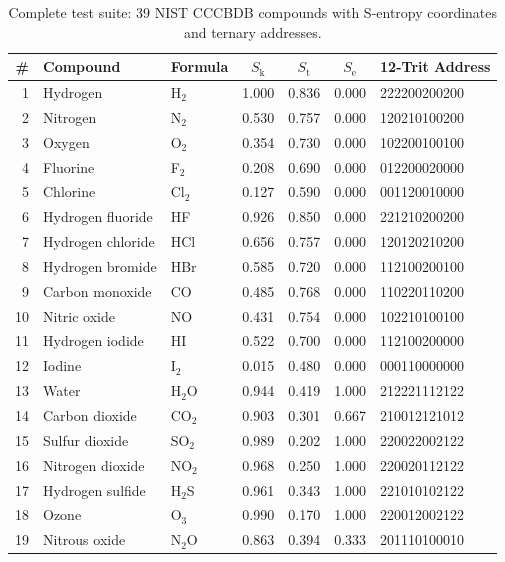 \documentclass[11pt,twocolumn,a4paper]{article}
\theoremstyle{definition}
\theoremstyle{remark}
\newcommand{\Sk}{S_{\mathrm{k}}}
\newcommand{\St}{S_{\mathrm{t}}}
\newcommand{\Se}{S_{\mathrm{e}}}
\begin{document}
\begin{table}[!ht]
\centering
\caption{Complete test suite: 39 NIST CCCBDB compounds with S-entropy coordinates and ternary addresses.}
\label{tab:test-suite}
\small
\begin{tabular}{@{}rllcccl@{}}
\toprule
\# & \textbf{Compound} & \textbf{Formula} & $\Sk$ & $\St$ & $\Se$ & \textbf{12-Trit Address} \\
\midrule
1  & Hydrogen         & H$_2$    & 1.000 & 0.836 & 0.000 & 222200200200 \\
2  & Nitrogen         & N$_2$    & 0.530 & 0.757 & 0.000 & 120210100200 \\
3  & Oxygen           & O$_2$    & 0.354 & 0.730 & 0.000 & 102200100100 \\
4  & Fluorine         & F$_2$    & 0.208 & 0.690 & 0.000 & 012200020000 \\
5  & Chlorine         & Cl$_2$   & 0.127 & 0.590 & 0.000 & 001120010000 \\
6  & Hydrogen fluoride & HF      & 0.926 & 0.850 & 0.000 & 221210200200 \\
7  & Hydrogen chloride & HCl     & 0.656 & 0.757 & 0.000 & 120120210200 \\
8  & Hydrogen bromide & HBr      & 0.585 & 0.720 & 0.000 & 112100200100 \\
9  & Carbon monoxide  & CO       & 0.485 & 0.768 & 0.000 & 110220110200 \\
10 & Nitric oxide     & NO       & 0.431 & 0.754 & 0.000 & 102210100100 \\
11 & Hydrogen iodide  & HI       & 0.522 & 0.700 & 0.000 & 112100200000 \\
12 & Iodine           & I$_2$    & 0.015 & 0.480 & 0.000 & 000110000000 \\
\midrule
13 & Water            & H$_2$O   & 0.944 & 0.419 & 1.000 & 212221112122 \\
14 & Carbon dioxide   & CO$_2$   & 0.903 & 0.301 & 0.667 & 210012121012 \\
15 & Sulfur dioxide   & SO$_2$   & 0.989 & 0.202 & 1.000 & 220022002122 \\
16 & Nitrogen dioxide & NO$_2$   & 0.968 & 0.250 & 1.000 & 220020112122 \\
17 & Hydrogen sulfide & H$_2$S   & 0.961 & 0.343 & 1.000 & 221010102122 \\
18 & Ozone            & O$_3$    & 0.990 & 0.170 & 1.000 & 220012002122 \\
19 & Nitrous oxide    & N$_2$O   & 0.863 & 0.394 & 0.333 & 201110100010 \\

\end{tabular}
\end{table}
\end{document}
